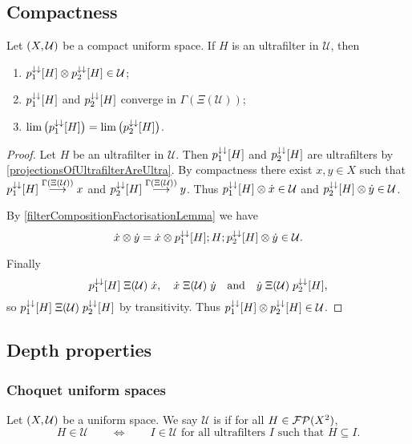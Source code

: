 \subsection{Compactness}
\begin{proposition} \label{compactUltrafilterFactorisation}
Let $\left( X,\mathcal{U} \right)$ be a compact uniform space. If $H$ is an ultrafilter in $\mathcal{U}$, then 
\begin{enumerate}
\item $p_1^{\downarrow\downarrow}[H]\otimes p_2^{\downarrow\downarrow}[H] \in\mathcal{U}$;
\item $p_1^{\downarrow\downarrow}[H]$ and $p_2^{\downarrow\downarrow}[H]$ converge in $\Gamma(\Xi(\mathcal{U}))$;
\item $\lim\big(p_1^{\downarrow\downarrow}[H]\big) = \lim\big(p_2^{\downarrow\downarrow}[H]\big)$.
\end{enumerate}
\end{proposition}
\begin{proof}
Let $H$ be an ultrafilter in $\mathcal{U}$. Then $p_1^{\downarrow\downarrow}[H]$ and $p_2^{\downarrow\downarrow}[H]$ are ultrafilters by \ref{projectionsOfUltrafilterAreUltra}. By compactness there exist $x,y\in X$ such that $p_1^{\downarrow\downarrow}[H] \overset{\Gamma(\Xi(\mathcal{U}))}{\longrightarrow} x$ and $p_2^{\downarrow\downarrow}[H] \overset{\Gamma(\Xi(\mathcal{U}))}{\longrightarrow} y$. Thus $p_1^{\downarrow\downarrow}[H]\otimes \dot{x}\in\mathcal{U}$ and $p_2^{\downarrow\downarrow}[H]\otimes \dot{y}\in\mathcal{U}$. 

By \ref{filterCompositionFactorisationLemma} we have
\[ \dot{x}\otimes \dot{y} = \dot{x}\otimes p_1^{\downarrow\downarrow}[H]; H; p_2^{\downarrow\downarrow}[H] \otimes \dot{y} \in \mathcal{U}. \]

Finally
\[ p_1^{\downarrow\downarrow}[H] \mathrel{\Xi(\mathcal{U})} \dot{x}, \quad \dot{x} \mathrel{\Xi(\mathcal{U})} \dot{y} \quad\text{and}\quad \dot{y}\mathrel{\Xi(\mathcal{U})} p_2^{\downarrow\downarrow}[H], \]
so $p_1^{\downarrow\downarrow}[H] \mathrel{\Xi(\mathcal{U})} p_2^{\downarrow\downarrow}[H]$ by transitivity. Thus $p_1^{\downarrow\downarrow}[H]\otimes p_2^{\downarrow\downarrow}[H] \in \mathcal{U}$.
\end{proof}

\subsection{Depth properties}
\subsubsection{Choquet uniform spaces}
\begin{definition}
Let $\left( X,\mathcal{U} \right)$ be a uniform space. We say $\mathcal{U}$ is  if for all $H\in \operatorname{\mathcal{FP}}(X^2)$,
\[ H\in\mathcal{U} \qquad\iff\qquad \text{$I \in \mathcal{U}$ for all ultrafilters $I$ such that $H\subseteq I$.} \]
\end{definition}

